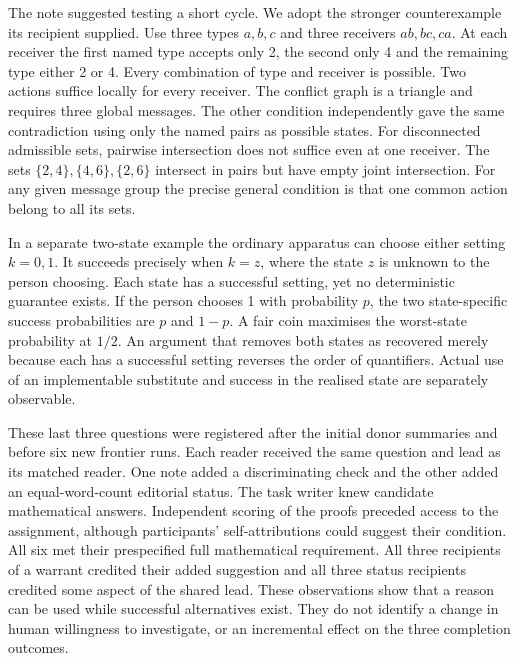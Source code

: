 \documentclass[11pt,a4paper]{article}
\begin{document}
The note suggested testing a short cycle. We adopt the stronger counterexample its recipient supplied. Use three types \(a,b,c\) and three receivers \(ab,bc,ca\). At each receiver the first named type accepts only 2, the second only 4 and the remaining type either 2 or 4. Every combination of type and receiver is possible. Two actions suffice locally for every receiver. The conflict graph is a triangle and requires three global messages. The other condition independently gave the same contradiction using only the named pairs as possible states. For disconnected admissible sets, pairwise intersection does not suffice even at one receiver. The sets \(\{2,4\},\{4,6\},\{2,6\}\) intersect in pairs but have empty joint intersection. For any given message group the precise general condition is that one common action belong to all its sets.

In a separate two-state example the ordinary apparatus can choose either setting \(k=0,1\). It succeeds precisely when \(k=z\), where the state \(z\) is unknown to the person choosing. Each state has a successful setting, yet no deterministic guarantee exists. If the person chooses 1 with probability \(p\), the two state-specific success probabilities are \(p\) and \(1-p\). A fair coin maximises the worst-state probability at \(1/2\). An argument that removes both states as recovered merely because each has a successful setting reverses the order of quantifiers. Actual use of an implementable substitute and success in the realised state are separately observable.

These last three questions were registered after the initial donor summaries and before six new frontier runs. Each reader received the same question and lead as its matched reader. One note added a discriminating check and the other added an equal-word-count editorial status. The task writer knew candidate mathematical answers. Independent scoring of the proofs preceded access to the assignment, although participants' self-attributions could suggest their condition. All six met their prespecified full mathematical requirement. All three recipients of a warrant credited their added suggestion and all three status recipients credited some aspect of the shared lead. These observations show that a reason can be used while successful alternatives exist. They do not identify a change in human willingness to investigate, or an incremental effect on the three completion outcomes.
\end{document}
